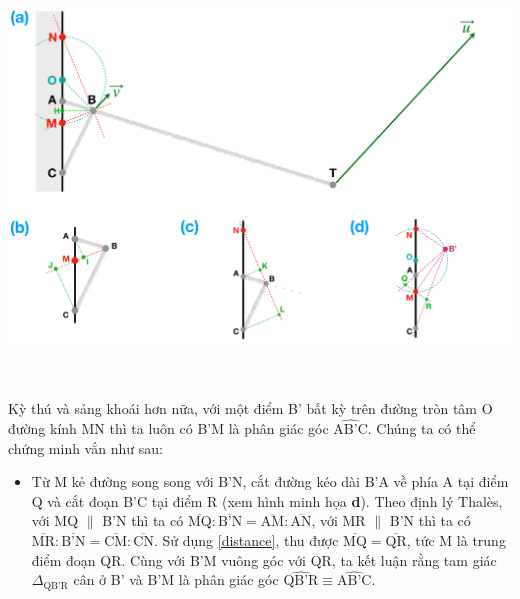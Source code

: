 \begin{center}
\includegraphics[width=\textwidth,keepaspectratio]{Problem_3/Figs/S3.png}
\end{center}

\ \

Kỳ thú và sảng khoái hơn nữa, với một điểm B' bất kỳ trên đường tròn tâm O đường kính MN thì ta luôn có B'M là phân giác góc $\widehat{\text{AB'C}}$. Chúng ta có thể chứng minh vắn như sau:

\begin{itemize}
     \item Từ M kẻ đường song song với B'N, cắt đường kéo dài B'A về phía A tại điểm Q và cắt đoạn B'C tại điểm R (xem hình minh họa \textbf{d}). Theo định lý Thalès, với MQ $\parallel$ B'N thì ta có $\overline{\text{MQ}}:\overline{\text{B'N}} = \overline{\text{AM}}:\overline{\text{AN}}$, với MR $\parallel$ B'N thì ta có $\overline{\text{MR}}:\overline{\text{B'N}} = \overline{\text{CM}}:\overline{\text{CN}}$. Sử dụng \eqref{distance}, thu được $\overline{\text{MQ}}=\overline{\text{QR}}$, tức M là trung điểm đoạn QR. Cùng với B'M vuông góc với QR, ta kết luận rằng tam giác $\Delta_\text{QB'R}$ cân ở B' và B'M là phân giác góc $\widehat{\text{QB'R}} \equiv \widehat{\text{AB'C}}$.
 \end{itemize}
    
\ \ 

